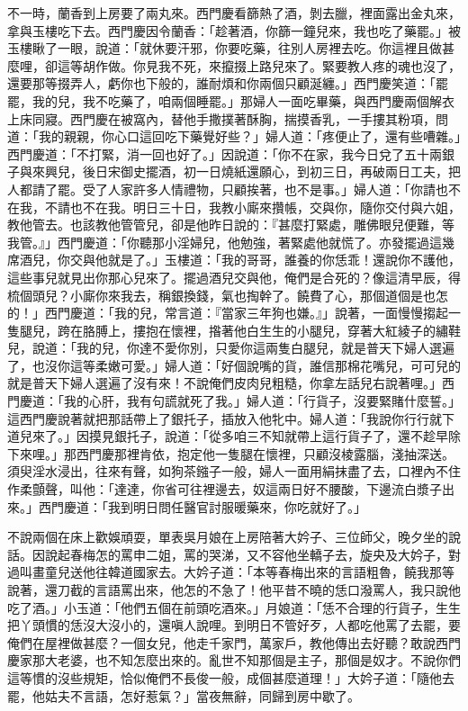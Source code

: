 不一時，蘭香到上房要了兩丸來。西門慶看篩熱了酒，剝去臘，裡面露出金丸來，拿與玉樓吃下去。西門慶因令蘭香：「趁著酒，你篩一鐘兒來，我也吃了藥罷。」被玉樓瞅了一眼，說道：「就休要汗邪，你要吃藥，往別人房裡去吃。你這裡且做甚麼哩，卻這等胡作做。你見我不死，來攛掇上路兒來了。緊要教人疼的魂也沒了，還要那等掇弄人，虧你也下般的，誰耐煩和你兩個只顧涎纏。」西門慶笑道：「罷罷，我的兒，我不吃藥了，咱兩個睡罷。」那婦人一面吃畢藥，與西門慶兩個解衣上床同寢。西門慶在被窩內，替他手撒撲著酥胸，揣摸香乳，一手摟其粉項，問道：「我的親親，你心口這回吃下藥覺好些？」婦人道：「疼便止了，還有些嘈雜。」西門慶道：「不打緊，消一回也好了。」因說道：「你不在家，我今日兌了五十兩銀子與來興兒，後日宋御史擺酒，初一日燒紙還願心，到初三日，再破兩日工夫，把人都請了罷。受了人家許多人情禮物，只顧挨著，也不是事。」婦人道：「你請也不在我，不請也不在我。明日三十日，我教小廝來攢帳，交與你，隨你交付與六姐，教他管去。也該教他管管兒，卻是他昨日說的：『甚麼打緊處，雕佛眼兒便難，等我管。』」西門慶道：「你聽那小淫婦兒，他勉強，著緊處他就慌了。亦發擺過這幾席酒兒，你交與他就是了。」玉樓道：「我的哥哥，誰養的你恁乖！還說你不護他，這些事兒就見出你那心兒來了。擺過酒兒交與他，俺們是合死的？像這清早辰，得梳個頭兒？小廝你來我去，稱銀換錢，氣也掏幹了。饒費了心，那個道個是也怎的！」西門慶道：「我的兒，常言道：『當家三年狗也嫌。』」說著，一面慢慢搊起一隻腿兒，跨在胳膊上，摟抱在懷裡，揝著他白生生的小腿兒，穿著大紅綾子的繡鞋兒，說道：「我的兒，你達不愛你別，只愛你這兩隻白腿兒，就是普天下婦人選遍了，也沒你這等柔嫩可愛。」婦人道：「好個說嘴的貨，誰信那棉花嘴兒，可可兒的就是普天下婦人選遍了沒有來！不說俺們皮肉兒粗糙，你拿左話兒右說著哩。」西門慶道：「我的心肝，我有句謊就死了我。」婦人道：「行貨子，沒要緊賭什麼誓。」這西門慶說著就把那話帶上了銀托子，插放入他牝中。婦人道：「我說你行行就下道兒來了。」因摸見銀托子，說道：「從多咱三不知就帶上這行貨子了，還不趁早除下來哩。」那西門慶那裡肯依，抱定他一隻腿在懷裡，只顧沒棱露腦，淺抽深送。須臾淫水浸出，往來有聲，如狗茶鏹子一般，婦人一面用絹抹盡了去，口裡內不住作柔顫聲，叫他：「達達，你省可往裡邊去，奴這兩日好不腰酸，下邊流白漿子出來。」西門慶道：「我到明日問任醫官討服暖藥來，你吃就好了。」

不說兩個在床上歡娛頑耍，單表吳月娘在上房陪著大妗子、三位師父，晚夕坐的說話。因說起春梅怎的罵申二姐，罵的哭涕，又不容他坐轎子去，旋央及大妗子，對過叫畫童兒送他往韓道國家去。大妗子道：「本等春梅出來的言語粗魯，饒我那等說著，還刀截的言語罵出來，他怎的不急了！他平昔不曉的恁口潑罵人，我只說他吃了酒。」小玉道：「他們五個在前頭吃酒來。」月娘道：「恁不合理的行貨子，生生把丫頭慣的恁沒大沒小的，還嗔人說哩。到明日不管好歹，人都吃他罵了去罷，要俺們在屋裡做甚麼？一個女兒，他走千家門，萬家戶，教他傳出去好聽？敢說西門慶家那大老婆，也不知怎麼出來的。亂世不知那個是主子，那個是奴才。不說你們這等慣的沒些規矩，恰似俺們不長俊一般，成個甚麼道理！」大妗子道：「隨他去罷，他姑夫不言語，怎好惹氣？」當夜無辭，同歸到房中歇了。

